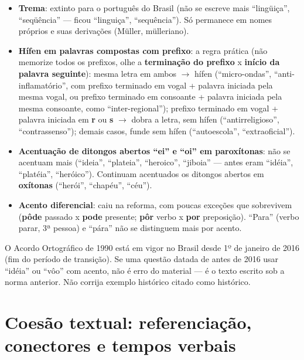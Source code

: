 \begin{conceito}
\begin{itemize}
\item \textbf{Trema}: extinto para o português do Brasil (não se escreve mais
“lingüiça”, “seqüência” --- ficou “linguiça”, “sequência”). Só permanece em
nomes próprios e suas derivações (Müller, mülleriano).
\item \textbf{Hífen em palavras compostas com prefixo}: a regra prática (não
memorize todos os prefixos, olhe a \textbf{terminação do prefixo} x
\textbf{início da palavra seguinte}): mesma letra em ambos $\to$ hífen
(“micro-ondas”, “anti-inflamatório”, com prefixo terminado em vogal + palavra
iniciada pela mesma vogal, ou prefixo terminado em consoante + palavra
iniciada pela mesma consoante, como “inter-regional”); prefixo terminado em
vogal + palavra iniciada em \textbf{r} ou \textbf{s} $\to$ dobra a letra, sem
hífen (“antirreligioso”, “contrassenso”); demais casos, funde sem hífen
(“autoescola”, “extraoficial”).
\item \textbf{Acentuação de ditongos abertos “ei” e “oi” em paroxítonas}: não
se acentuam mais (“ideia”, “plateia”, “heroico”, “jiboia” --- antes eram
“idéia”, “platéia”, “heróico”). Continuam acentuados os ditongos abertos em
\textbf{oxítonas} (“herói”, “chapéu”, “céu”).
\item \textbf{Acento diferencial}: caiu na reforma, com poucas exceções que
sobrevivem (\textbf{pôde} passado x \textbf{pode} presente; \textbf{pôr}
verbo x \textbf{por} preposição). “Para” (verbo parar, 3ª pessoa) e “pára”
não se distinguem mais por acento.
\end{itemize}
\end{conceito}

\begin{cuidado}
O Acordo Ortográfico de 1990 está em vigor no Brasil desde 1º de janeiro de
2016 (fim do período de transição). Se uma questão datada de antes de 2016
usar “idéia” ou “vôo” com acento, não é erro do material --- é o texto
escrito sob a norma anterior. Não corrija exemplo histórico citado como
histórico.
\end{cuidado}

\section{Coesão textual: referenciação, conectores e tempos verbais}

